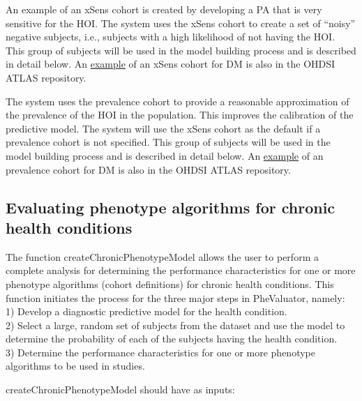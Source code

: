 \documentclass[
]{article}
\begin{document}
An example of an xSens cohort is created by developing a PA that is very
sensitive for the HOI. The system uses the xSens cohort to create a set
of ``noisy'' negative subjects, i.e., subjects with a high likelihood of
not having the HOI. This group of subjects will be used in the model
building process and is described in detail below. An
\href{http://www.ohdsi.org/web/atlas/\#/cohortdefinition/1770120}{example}
of an xSens cohort for DM is also in the OHDSI ATLAS repository.

The system uses the prevalence cohort to provide a reasonable
approximation of the prevalence of the HOI in the population. This
improves the calibration of the predictive model. The system will use
the xSens cohort as the default if a prevalence cohort is not specified.
This group of subjects will be used in the model building process and is
described in detail below. An
\href{http://www.ohdsi.org/web/atlas/\#/cohortdefinition/1770119}{example}
of an prevalence cohort for DM is also in the OHDSI ATLAS repository.

\hypertarget{evaluating-phenotype-algorithms-for-chronic-health-conditions}{%
\subsection{Evaluating phenotype algorithms for chronic health
conditions}\label{evaluating-phenotype-algorithms-for-chronic-health-conditions}}

The function createChronicPhenotypeModel allows the user to perform a
complete analysis for determining the performance characteristics for
one or more phenotype algorithms (cohort definitions) for chronic health
conditions. This function initiates the process for the three major
steps in PheValuator, namely:\\
1) Develop a diagnostic predictive model for the health condition.\\
2) Select a large, random set of subjects from the dataset and use the
model to determine the probability of each of the subjects having the
health condition.\\
3) Determine the performance characteristics for one or more phenotype
algorithms to be used in studies.

createChronicPhenotypeModel should have as inputs:
\end{document}
